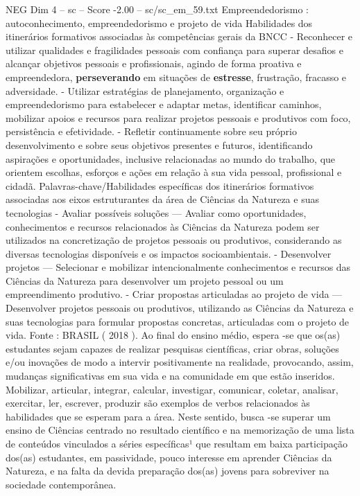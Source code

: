 \begin{textsample}{NEG Dim 4 – sc – Score -2.00 – sc/sc\_em\_59.txt}
Empreendedorismo : autoconhecimento, empreendedorismo e projeto de vida Habilidades dos itinerários formativos associadas às competências gerais da BNCC - Reconhecer e utilizar qualidades e fragilidades pessoais com confiança para superar desafios e alcançar objetivos pessoais e profissionais, agindo de forma proativa e empreendedora, \textbf{perseverando} em situações de \textbf{estresse}, frustração, fracasso e adversidade. - Utilizar estratégias de planejamento, organização e empreendedorismo para estabelecer e adaptar metas, identificar caminhos, mobilizar apoios e recursos para realizar projetos pessoais e produtivos com foco, persistência e efetividade. - Refletir continuamente sobre seu próprio desenvolvimento e sobre seus objetivos presentes e futuros, identificando aspirações e oportunidades, inclusive relacionadas ao mundo do trabalho, que orientem escolhas, esforços e ações em relação à sua vida pessoal, profissional e cidadã.
Palavras-chave/Habilidades específicas dos itinerários formativos associadas aos eixos estruturantes da área de Ciências da Natureza e suas tecnologias - Avaliar possíveis soluções — Avaliar como oportunidades, conhecimentos e recursos relacionados às Ciências da Natureza podem ser utilizados na concretização de projetos pessoais ou produtivos, considerando as diversas tecnologias disponíveis e os impactos socioambientais. - Desenvolver projetos — Selecionar e mobilizar intencionalmente conhecimentos e recursos das Ciências da Natureza para desenvolver um projeto pessoal ou um empreendimento produtivo. - Criar propostas articuladas ao projeto de vida — Desenvolver projetos pessoais ou produtivos, utilizando as Ciências da Natureza e suas tecnologias para formular propostas concretas, articuladas com o projeto de vida.
Fonte : BRASIL ( 2018 ).
Ao final do ensino médio, espera -se que os(as) estudantes sejam capazes de realizar pesquisas científicas, criar obras, soluções e/ou inovações de modo a intervir positivamente na realidade, provocando, assim, mudanças significativas em sua vida e na comunidade em que estão inseridos.
Mobilizar, articular, integrar, calcular, investigar, comunicar, coletar, analisar, exercitar, ler, escrever, produzir são exemplos de verbos relacionados às habilidades que se esperam para a área.
Neste sentido, busca -se superar um ensino de Ciências centrado no resultado científico e na memorização de uma lista de conteúdos vinculados a séries específicas¹ que resultam em baixa participação dos(as) estudantes, em passividade, pouco interesse em aprender Ciências da Natureza, e na falta da devida preparação dos(as) jovens para sobreviver na sociedade contemporânea.

\end{textsample}
